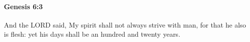 
		\paragraph{Genesis 6:3} %
			\label{GENESIS-6-3}

			And the LORD said, My spirit shall not always strive with man, for that he also is flesh: yet his days shall be an hundred and twenty years.



